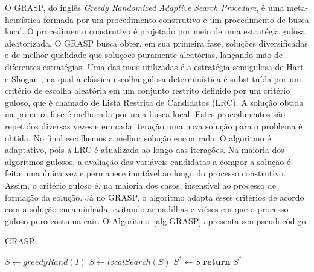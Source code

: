 \documentclass[12pt, a4paper]{article}
\begin{document}
O GRASP, do inglês \textit{Greedy Randomized Adaptive Search Procedure}, é uma meta-heurística formada por um procedimento construtivo e um procedimento de busca local. O procedimento construtivo é projetado por meio de uma estratégia gulosa aleatorizada. O GRASP busca obter, em sua primeira fase, soluções diversificadas e de melhor qualidade que soluções puramente aleatórias, lançando mão de diferentes estratégias. Uma das mais utilizadas é a estratégia semigulosa de Hart e Shogan \cite{hart1987semi}, na qual a clássica escolha gulosa determinística é substituída por um critério de escolha aleatória em um conjunto restrito definido por um critério guloso, que é chamado de Lista Restrita de Candidatos (LRC). A solução obtida na primeira fase é melhorada por uma busca local. Estes procedimentos são repetidos diversas vezes e em cada iteração  uma nova solução para o problema é obtida. No final escolhemos a melhor solução encontrada. O algoritmo é adaptativo, pois a  LRC é atualizada ao longo das iterações. Na maioria dos algoritmos gulosos, a avaliação das variáveis candidatas a compor a solução é feita uma única vez e permanece imutável ao longo do processo construtivo. Assim, o critério guloso é, na maioria dos casos, insensível ao processo de formação da solução. Já no GRASP, o algoritmo adapta esses critérios de acordo com a solução encaminhada, evitando armadilhas e viéses em que o processo guloso puro costuma cair. O Algoritmo~\ref{alg:GRASP} apresenta seu pseudocódigo.
%
\begin{algorithm}[htb!]
  \caption{GRASP}\label{alg:GRASP}
  \begin{algorithmic}[1]
       \State $S \gets greedyRand(I)$
       \State $S \gets localSearch(S)$ 
	      \State $S^* \gets S$
	  \EndIf
      \EndWhile
      \State \textbf{return} $S^*$
      \EndFunction
  \end{algorithmic}
\end{algorithm}
\end{document}

